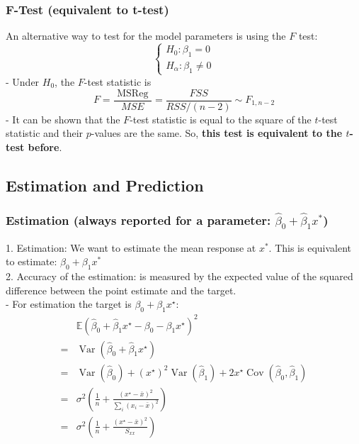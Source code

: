 \documentclass[11pt,a4paper]{article}
\begin{document}
\subsubsection{F-Test (equivalent to t-test)}
An alternative way to test for the model parameters is using the $F$ test:
$$
\left\{\begin{array}{l}
H_{0}: \beta_{1}=0 \\
H_{\alpha}: \beta_{1} \neq 0
\end{array}\right.
$$
- Under $H_{0}$, the $F$-test statistic is
$$
F=\frac{\text { MSReg }}{M S E}=\frac{F S S}{R S S /(n-2)} \sim F_{1, n-2}
$$
- It can be shown that the $F$-test statistic is equal to the square of the $t$-test statistic and their $p$-values are the same. So, \textbf{this test is equivalent to the $t$-test before}.

\subsection{Estimation and Prediction}

\subsubsection{Estimation (always reported for a parameter: $\hat{\beta}_0+\hat{\beta}_1x^*$)}
1. Estimation: We want to estimate the mean response at $x^*$. This is equivalent to estimate: $\beta_0+\beta_1x^*$\\
2. Accuracy of the estimation: is measured by the expected value of the squared difference between the point estimate and the target.\\
- For estimation the target is $\beta_{0}+\beta_{1} x^{\star}:$
$$
\begin{aligned}
& \mathbb{E}\left(\hat{\beta}_{0}+\hat{\beta}_{1} x^{\star}-\beta_{0}-\beta_{1} x^{\star}\right)^{2} \\
=& \operatorname{Var}\left(\hat{\beta}_{0}+\hat{\beta}_{1} x^{\star}\right) \\
=& \operatorname{Var}\left(\hat{\beta}_{0}\right)+\left(x^{\star}\right)^{2} \operatorname{Var}\left(\hat{\beta}_{1}\right)+2 x^{\star} \operatorname{Cov}\left(\hat{\beta}_{0}, \hat{\beta}_{1}\right) \\
=& \sigma^{2}\left(\frac{1}{n}+\frac{\left(x^{\star}-\bar{x}\right)^{2}}{\sum_{i}\left(x_{i}-\bar{x}\right)^{2}}\right) \\
=& \sigma^{2}\left(\frac{1}{n}+\frac{\left(x^{\star}-\bar{x}\right)^{2}}{S_{x x}}\right)
\end{aligned}
$$
\end{document}

